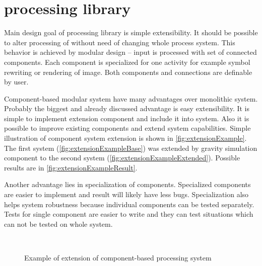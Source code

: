 
\section{\lsystem processing library}
Main design goal of \lsystem processing library is simple extensibility.
It should be possible to alter processing of \lsystem without need of changing whole process system.
This behavior is achieved by modular design -- input is processed with set of connected components.
Each component is specialized for one activity for example symbol rewriting or rendering of image.
Both components and connections are definable by user.

Component-based modular system have many advantages over monolithic system.
Probably the biggest and already discussed advantage is easy extensibility.
It is simple to implement extension component and include it into system.
Also it is possible to improve existing components and extend system capabilities.
Simple illustration of component system extension is shown in \autoref{fig:extensionExample}.
The first system (\ref{fig:extensionExampleBase}) was extended by gravity simulation component to the second system (\ref{fig:extensionExampleExtended}).
Possible results are in \autoref{fig:extensionExampleResult}.

Another advantage lies in specialization of components.
Specialized components are easier to implement and result will likely have less bugs.
Specialization also helps system robustness because individual components can be tested separately.
Tests for single component are easier to write and they can test situations which can not be tested on whole system.

\begin{figure}[h]
	\centering
	\\
	\caption{Example of extension of component-based \lsystem processing system}
	\label{fig:extensionExample}
\end{figure}

